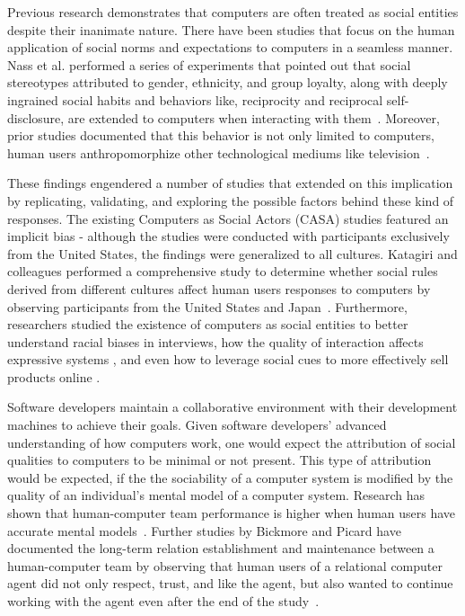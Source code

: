 \documentclass{sig-alternate-05-2015}
\begin{document}
Previous research demonstrates that computers are often treated as social entities despite their inanimate nature. There have been studies that focus on the human application of social norms and expectations to computers in a seamless manner. Nass et al. performed a series of experiments that pointed out that social stereotypes attributed to gender, ethnicity, and group loyalty, along with deeply ingrained social habits and behaviors like, reciprocity and reciprocal self-disclosure, are extended to computers when interacting with them~\cite{Nass2000machines,nass1999people}. Moreover, prior studies documented that this behavior is not only limited to computers, human users anthropomorphize other technological mediums like television~\cite{reeves1996people}.

\hfill

These findings engendered a number of studies that extended on this implication by replicating, validating, and exploring the possible factors behind these kind of responses. The existing Computers as Social Actors (CASA) studies featured an implicit bias - although the studies were conducted with participants exclusively from the United States, the findings were generalized to all cultures. Katagiri and colleagues performed a comprehensive study to determine whether social rules derived from different cultures affect human users responses to computers by observing participants from the United States and Japan~\cite{katagiri2001cross}. Furthermore, researchers studied the existence of computers as social entities to better understand racial biases in interviews\cite{krysan2003race}, how the quality of interaction affects expressive systems \cite{vidyarthi2011sympathetic}, and even how to leverage social cues to more effectively sell products online \cite{wang2007can}.

\hfill

Software developers maintain a collaborative environment with their development machines to achieve their goals. Given software developers' advanced understanding of how computers work, one would expect the attribution of social qualities to computers to be minimal or not present.  This type of attribution would be expected, if the the sociability of a computer system is modified by the quality of an individual's mental model of a computer system. Research has shown that human-computer team performance is higher when human users have accurate mental models~\cite{wilkison2008effects}. Further studies by Bickmore and Picard have documented the long-term relation establishment and maintenance between a human-computer team by observing that human users of a relational computer agent did not only respect, trust, and like the agent, but also wanted to continue working with the agent even after the end of the study~\cite{Bickmore:2005:EML:1067860.1067867}. 
\end{document}
